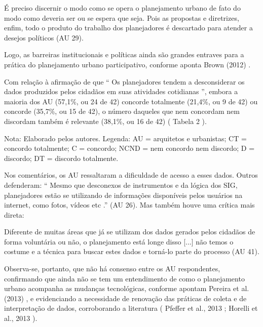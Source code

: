 \documentclass{article}
\begin{document}
É preciso discernir o modo como se opera o planejamento urbano de fato do
						modo como deveria ser ou se espera que seja. Pois as propostas e diretrizes,
						enfim, todo o produto do trabalho dos planejadores é descartado para atender
						a desejos políticos %
(AU 29).%


Logo, as barreiras institucionais e políticas ainda são grandes entraves para a
					prática do planejamento urbano participativo, conforme aponta %
Brown (2012)%
.

Com relação à afirmação de que “%
Os planejadores tendem a desconsiderar os
						dados produzidos pelos cidadãos em suas atividades cotidianas%
”,
					embora a maioria dos AU (57,1\%, ou 24 de 42) concorde totalmente (21,4\%, ou 9 de
					42) ou concorde (35,7\%, ou 15 de 42), o número daqueles que nem concordam nem
					discordam também é relevante (38,1\%, ou 16 de 42) (%
Tabela 2%
).

Nota: Elaborado pelos autores. Legenda: AU = arquitetos e urbanistas;
								CT = concordo totalmente; C = concordo; NCND = nem concordo nem
								discordo; D = discordo; DT = discordo totalmente.

Nos comentários, os AU ressaltaram a dificuldade de acesso a esses dados. Outros
					defenderam: “%
Mesmo que desconexos de instrumentos e da lógica dos SIG,
						planejadores estão se utilizando de informações disponíveis pelos usuários
						na internet, como fotos, vídeos etc%
.” (AU 26). Mas também houve uma
					crítica mais direta: 

Diferente de muitas áreas que já se utilizam dos dados gerados pelos cidadãos
						de forma voluntária ou não, o planejamento está longe disso
[...]%
 não temos o costume e a técnica para buscar estes
						dados e torná-lo parte do processo %
(AU 41).%


Observa-se, portanto, que não há consenso entre os AU respondentes, confirmando
					que ainda não se tem um entendimento de como o planejamento urbano acompanha as
					mudanças tecnológicas, conforme apontam %
Pereira
						et al. (2013)%
, e evidenciando a necessidade de renovação das práticas
					de coleta e de interpretação de dados, corroborando a literatura (%
Pfeffer et al., 2013%
; %
Horelli et al., 2013%
).
\end{document}
